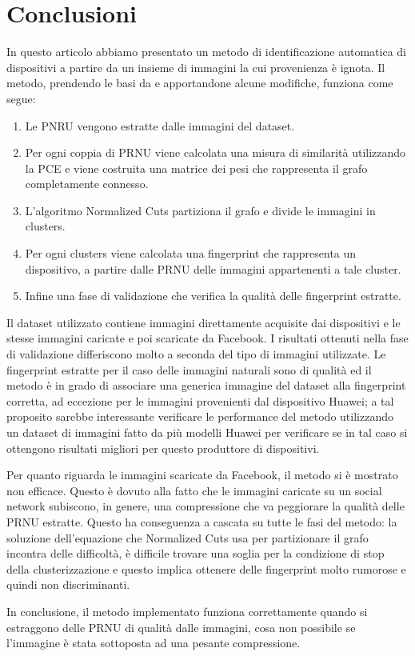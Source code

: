 \section{Conclusioni}

In questo articolo abbiamo presentato un metodo di identificazione automatica di dispositivi a partire da un insieme di immagini la cui provenienza è ignota. Il metodo, prendendo le basi da \cite{ Amerini2014831} e apportandone alcune modifiche, funziona come segue:
\begin{enumerate}
\item Le PNRU vengono estratte dalle immagini del dataset. 
\item Per ogni coppia di PRNU viene calcolata una misura di similarità utilizzando la PCE e viene costruita una matrice dei pesi che rappresenta il grafo completamente connesso.
\item L'algoritmo Normalized Cuts partiziona il grafo e divide le immagini in clusters.
\item Per ogni clusters viene calcolata una fingerprint che rappresenta un dispositivo, a partire dalle PRNU delle immagini appartenenti a tale cluster.
\item Infine una fase di validazione che verifica la qualità delle fingerprint estratte.
\end{enumerate}

Il dataset utilizzato contiene immagini direttamente acquisite dai dispositivi e le stesse immagini caricate e poi scaricate da Facebook. I risultati ottenuti nella fase di validazione differiscono molto a seconda del tipo di immagini utilizzate. Le fingerprint estratte per il caso delle immagini naturali sono di qualità ed il metodo è in grado di associare una generica immagine del dataset alla fingerprint corretta, ad eccezione per le immagini provenienti dal dispositivo Huawei; a tal proposito sarebbe interessante verificare le performance del metodo utilizzando un dataset di immagini fatto da più modelli Huawei per verificare se in tal caso si ottengono risultati migliori per questo produttore di dispositivi. 

Per quanto riguarda le immagini scaricate da Facebook, il metodo si è mostrato non efficace. Questo è dovuto alla fatto che le immagini caricate su un social network subiscono, in genere, una compressione che va peggiorare la qualità delle PRNU estratte. Questo ha conseguenza a cascata su tutte le fasi del metodo: la soluzione dell'equazione che Normalized Cuts usa per partizionare il grafo incontra delle difficoltà, è difficile trovare una soglia per la condizione di stop della clusterizzazione e questo implica ottenere delle fingerprint molto rumorose e quindi non discriminanti.

In conclusione, il metodo implementato funziona correttamente quando si estraggono delle PRNU di qualità dalle immagini, cosa non possibile se l'immagine è stata sottoposta ad una pesante compressione.